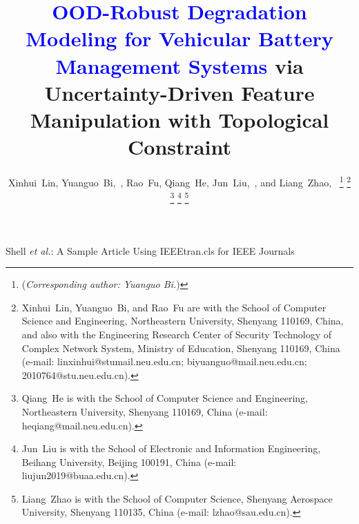 \documentclass[lettersize,journal]{IEEEtran}
\newcommand{\rev}[1]{\textcolor{blue}{#1}}
\begin{document}
\title{\rev{OOD-Robust Degradation Modeling for Vehicular Battery Management Systems} via Uncertainty-Driven Feature Manipulation with Topological Constraint}

\author{
    Xinhui~Lin,
    Yuanguo~Bi,~,
    Rao~Fu,
    Qiang~He,
    Jun~Liu,~,
    and Liang~Zhao,~
    \vspace{-1.5em}
\thanks{(\emph{Corresponding author: Yuanguo Bi.})}
\thanks{Xinhui~Lin, Yuanguo~Bi, and Rao~Fu are with the School of Computer Science and Engineering, Northeastern University, Shenyang 110169, China, and also with the Engineering Research Center of Security Technology of Complex Network System, Ministry of Education, Shenyang 110169, China (e-mail: linxinhui@stumail.neu.edu.cn; biyuanguo@mail.neu.edu.cn; 2010764@stu.neu.edu.cn).}
\thanks{Qiang~He is with the School of Computer Science and Engineering, Northeastern University, Shenyang 110169, China (e-mail: heqiang@mail.neu.edu.cn).}
\thanks{Jun~Liu is with the School of Electronic and Information Engineering, Beihang University, Beijing 100191, China (e-mail: liujun2019@buaa.edu.cn).}
\thanks{Liang~Zhao is with the School of Computer Science, Shenyang Aerospace
 University, Shenyang 110135, China (e-mail: lzhao@sau.edu.cn).}
}

%
{Shell \MakeLowercase{\textit{et al.}}: A Sample Article Using IEEEtran.cls for IEEE Journals}


\maketitle
\end{document}
